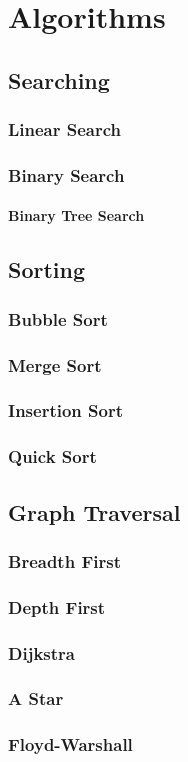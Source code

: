 \chapter{Algorithms}

	\section{Searching}
	
		\subsection{Linear Search}
		
		\subsection{\label{section:BinarySearch}Binary Search}
		
			\subsubsection{Binary Tree Search}
			
	\section{Sorting}
		
		\subsection{Bubble Sort}
		
		\subsection{Merge Sort}
		
		\subsection{Insertion Sort}
		
		\subsection{Quick Sort}
		
	\section{Graph Traversal}
	
		\subsection{Breadth First}
		
		\subsection{Depth First}
		
		\subsection{Dijkstra}
		
		\subsection{A Star}
		
		\subsection{Floyd-Warshall}